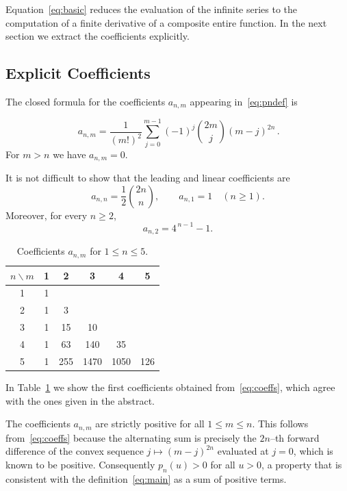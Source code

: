 \documentclass[10pt]{NSP1}
\begin{document}
Equation~\eqref{eq:basic} reduces the evaluation of the infinite series to the computation of 
a finite derivative of a composite entire function.  In the next section we extract the 
coefficients explicitly.


\subsection{Explicit Coefficients}
\label{sec:coeffs}

The closed formula for the coefficients $a_{n,m}$ appearing in~\eqref{eq:pndef} is

\begin{equation}\label{eq:coeffs}
\boxed{\,a_{n,m}=\frac{1}{(m!)^2}\sum_{j=0}^{m-1}(-1)^j\binom{2m}{j}(m-j)^{2n}\,}.
\end{equation}
For $m>n$ we have $a_{n,m}=0$.



It is not difficult to show that the leading and linear coefficients are
\[
a_{n,n}=\frac{1}{2}\binom{2n}{n},\qquad a_{n,1}=1\quad(n\ge 1).
\]
Moreover, for every $n\ge 2$,
\[
a_{n,2}=4^{\,n-1}-1.
\]

\begin{table}[H]
\centering
\caption{Coefficients $a_{n,m}$ for $1\le n\le 5$.}\label{tab:coeffs}
\begin{tabular}{c|ccccc}
\toprule
$n\backslash m$ & 1 & 2 & 3 & 4 & 5 \\
\midrule
1 & 1 & & & & \\
2 & 1 & 3 & & & \\
3 & 1 & 15 & 10 & & \\
4 & 1 & 63 & 140 & 35 & \\
5 & 1 & 255 & 1470 & 1050 & 126 \\
\bottomrule
\end{tabular}
\end{table}

In Table~\ref{tab:coeffs} we show the first coefficients obtained from~\eqref{eq:coeffs}, which agree with the ones given in the abstract.
\begin{remark}
The coefficients $a_{n,m}$ are strictly positive for all $1\le m\le n$.  This follows 
from~\eqref{eq:coeffs} because the alternating sum is precisely the $2n$--th forward 
difference of the convex sequence $j\mapsto (m-j)^{2n}$ evaluated at $j=0$, which is known to 
be positive.  Consequently $p_n(u)>0$ for all $u>0$, a property that is consistent with the 
definition~\eqref{eq:main} as a sum of positive terms.
\end{remark}
\end{document}
